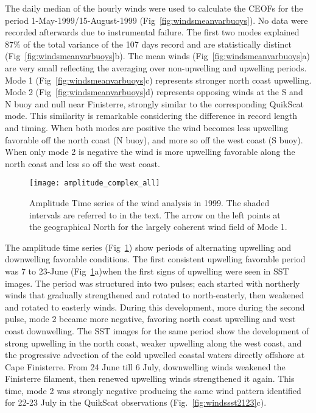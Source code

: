 The daily median of the hourly winds were used to calculate the
CEOFs for the period 1-May-1999/15-August-1999
(Fig~\ref{fig:windsmeanvarbuoys}). No data were recorded
afterwards due to instrumental failure. The first two modes
explained 87\% of the total variance of the 107 days record and
are statistically distinct (Fig~\ref{fig:windsmeanvarbuoys}b). The
mean winds (Fig~\ref{fig:windsmeanvarbuoys}a) are very small
reflecting the averaging over non-upwelling and upwelling periods.
Mode 1 (Fig~\ref{fig:windsmeanvarbuoys}c) represents stronger
north coast upwelling. Mode 2 (Fig~\ref{fig:windsmeanvarbuoys}d)
represents opposing winds at the S  and N buoy and null near
Finisterre, strongly similar to the corresponding QuikScat mode.
This similarity is remarkable considering the difference in record
length and timing. When both modes are positive the wind becomes
less upwelling favorable off the north coast (N buoy), and more so
off the west coast (S buoy). When only mode 2 is negative the wind
is more upwelling favorable along the north coast and less so off
the west coast.
\begin{figure}[t]
\centering
\texttt{[image: amplitude\_complex\_all]}
\caption{Amplitude Time series of the wind analysis in 1999. The
shaded intervals are referred to in the text. The arrow on the
left points at the geographical North for the largely coherent
wind field of Mode 1.}\label{fig:windsampbuoys}
\end{figure}

The amplitude time series ({Fig~\ref{fig:windsampbuoys}}) show
periods of alternating upwelling and downwelling favorable
conditions. The first consistent upwelling favorable period was
 7 to 23-June (Fig~\ref{fig:windsampbuoys}a)when the first signs of
upwelling were seen in SST images. The period was structured into
two pulses; each started with northerly winds that gradually
strengthened and rotated to north-easterly, then weakened and
rotated to easterly winds. During this development, more during
the second pulse, mode 2 became more negative, favoring north
coast upwelling and west coast downwelling. The SST images for the
same period show the development of strong upwelling in the north
coast, weaker upwelling along the west coast, and the progressive
advection of the cold upwelled coastal waters directly offshore at
Cape Finisterre. From 24 June till 6 July, downwelling winds
weakened the Finisterre filament, then renewed upwelling winds
strengthened it again. This time, mode 2 was strongly negative
producing the same wind pattern identified for 22-23 July in the
QuikScat observations (Fig.~\ref{fig:windssst2123}c).


